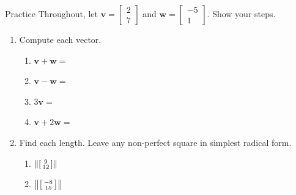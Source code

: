 \documentclass[10pt]{article}
\newcommand{\vv}{\mathbf{v}}
\newcommand{\ww}{\mathbf{w}}
\begin{document}

\vspace{0.12in}

\begin{notesbox}{Practice}
Throughout, let $\vv = \begin{bmatrix} 2 \\ 7 \end{bmatrix}$ and
$\ww = \begin{bmatrix} -5 \\ 1 \end{bmatrix}$. Show your steps.

\begin{enumerate}[leftmargin=1.9em, itemsep=12pt]
  \item Compute each vector.
    \begin{enumerate}[label=(\alph*), leftmargin=1.8em, itemsep=8pt]
      \item $\vv + \ww = {}$ \hfill
      \item $\vv - \ww = {}$ \hfill
      \item $3\vv = {}$ \hfill
      \item $\vv + 2\ww = {}$
    \end{enumerate}
  \item Find each length. Leave any non-perfect square in simplest radical form.
    \begin{enumerate}[label=(\alph*), leftmargin=1.8em, itemsep=4pt]
      \item $\left\|\begin{bsmallmatrix} 9 \\ 12 \end{bsmallmatrix}\right\|$ \hfill
      \item $\left\|\begin{bsmallmatrix} -8 \\ 15 \end{bsmallmatrix}\right\|$ \hfill

\end{enumerate}
\end{enumerate}
\end{notesbox}
\end{document}
